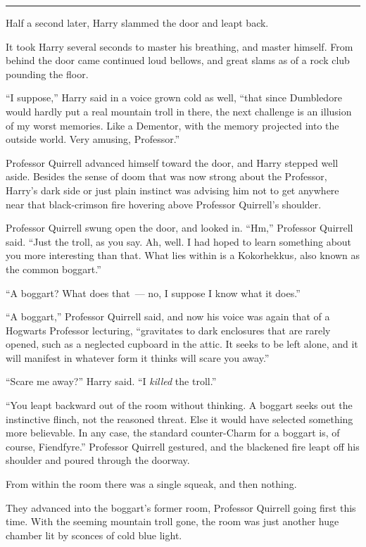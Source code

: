\begin{center}\rule{3in}{0.4pt}\end{center}

Half a second later, Harry slammed the door and leapt back.

It took Harry several seconds to master his breathing, and master himself. From behind the door came continued loud bellows, and great slams as of a rock club pounding the floor.

``I suppose,'' Harry said in a voice grown cold as well, ``that since Dumbledore would hardly put a real mountain troll in there, the next challenge is an illusion of my worst memories. Like a Dementor, with the memory projected into the outside world. Very amusing, Professor.''

Professor Quirrell advanced himself toward the door, and Harry stepped well aside. Besides the sense of doom that was now strong about the Professor, Harry's dark side or just plain instinct was advising him not to get anywhere near that black-crimson fire hovering above Professor Quirrell's shoulder.

Professor Quirrell swung open the door, and looked in. ``Hm,'' Professor Quirrell said. ``Just the troll, as you say. Ah, well. I had hoped to learn something about you more interesting than that. What lies within is a Kokorhekkus\emph{,} also known as the common boggart.''

``A boggart? What does that~--- no, I suppose I know what it does.''

``A boggart,'' Professor Quirrell said, and now his voice was again that of a Hogwarts Professor lecturing, ``gravitates to dark enclosures that are rarely opened, such as a neglected cupboard in the attic. It seeks to be left alone, and it will manifest in whatever form it thinks will scare you away.''

``Scare me away?'' Harry said. ``I \emph{killed} the troll.''

``You leapt backward out of the room without thinking. A boggart seeks out the instinctive flinch, not the reasoned threat. Else it would have selected something more believable. In any case, the standard counter-Charm for a boggart is, of course, Fiendfyre.'' Professor Quirrell gestured, and the blackened fire leapt off his shoulder and poured through the doorway.

From within the room there was a single squeak, and then nothing.

They advanced into the boggart's former room, Professor Quirrell going first this time. With the seeming mountain troll gone, the room was just another huge chamber lit by sconces of cold blue light.


